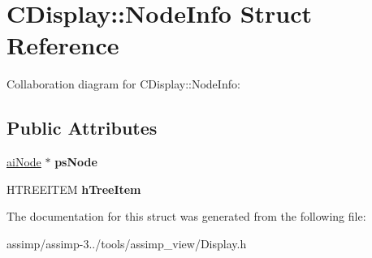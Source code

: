 \hypertarget{struct_c_display_1_1_node_info}{\section{C\+Display\+:\+:Node\+Info Struct Reference}
\label{struct_c_display_1_1_node_info}
}


Collaboration diagram for C\+Display\+:\+:Node\+Info\+:
\subsection*{Public Attributes}
\begin{DoxyCompactItemize}
\item 
\hypertarget{struct_c_display_1_1_node_info_ad1461156aefbbe2ec69338c11a525a17}{\hyperlink{structai_node}{ai\+Node} $\ast$ {\bfseries ps\+Node}}\label{struct_c_display_1_1_node_info_ad1461156aefbbe2ec69338c11a525a17}

\item 
\hypertarget{struct_c_display_1_1_node_info_ac246638ebbfedba1e4a5457f0bbe3e7c}{H\+T\+R\+E\+E\+I\+T\+E\+M {\bfseries h\+Tree\+Item}}\label{struct_c_display_1_1_node_info_ac246638ebbfedba1e4a5457f0bbe3e7c}

\end{DoxyCompactItemize}


The documentation for this struct was generated from the following file\+:\begin{DoxyCompactItemize}
\item 
assimp/assimp-\/3../tools/assimp\+\_\+view/Display.\+h\end{DoxyCompactItemize}
